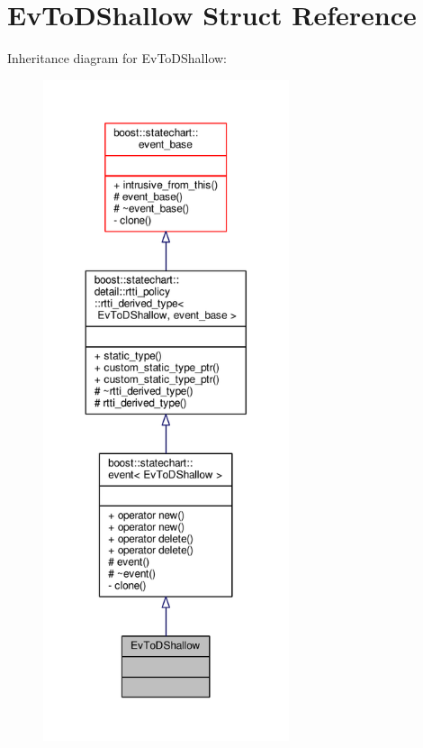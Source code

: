 \hypertarget{struct_ev_to_d_shallow}{}\section{Ev\+To\+D\+Shallow Struct Reference}
\label{struct_ev_to_d_shallow}


Inheritance diagram for Ev\+To\+D\+Shallow\+:
\nopagebreak
\begin{figure}[H]
\begin{center}
\leavevmode
\includegraphics[height=550pt]{struct_ev_to_d_shallow__inherit__graph}
\end{center}
\end{figure}


